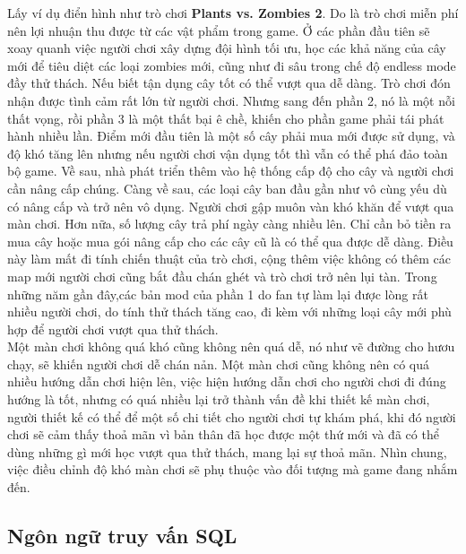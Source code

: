 \begin{itemize}
	Lấy ví dụ điển hình như trò chơi \textbf{Plants vs. Zombies 2}. Do là trò chơi miễn phí nên lợi nhuận thu được từ các vật phẩm trong game. Ở các phần đầu tiên sẽ xoay quanh việc người chơi xây dựng đội hình tối ưu, học các khả năng của cây mới để tiêu diệt các loại zombies mới, cũng như đi sâu trong chế độ endless mode đầy thử thách. Nếu biết tận dụng cây tốt có thể vượt qua dễ dàng. Trò chơi đón nhận được tình cảm rất lớn từ người chơi. Nhưng sang đến phần 2, nó là một nỗi thất vọng, rồi phần 3 là một thất bại ê chề, khiến cho phần game phải tái phát hành nhiều lần. Điểm mới đầu tiên là một số cây phải mua mới được sử dụng, và độ khó tăng lên nhưng nếu người chơi vận dụng tốt thì vẫn có thể phá đảo toàn bộ game. Về sau, nhà phát triển thêm vào hệ thống cấp độ cho cây và người chơi cần nâng cấp chúng. Càng về sau, các loại cây ban đầu gần như vô cùng yếu dù có nâng cấp và trở nên vô dụng. Người chơi gập muôn vàn khó khăn để vượt qua màn chơi. Hơn nữa, số lượng cây trả phí ngày càng nhiều lên. Chỉ cần bỏ tiền ra mua cây hoặc mua gói nâng cấp cho các cây cũ là có thể qua được dễ dàng. Điều này làm mất đi tính chiến thuật của trò chơi, cộng thêm việc không có thêm các map mới người chơi cũng bắt đầu chán ghét và trò chơi trở nên lụi tàn. Trong những năm gần đây,các bản mod của phần 1 do fan tự làm lại được lòng rất nhiều người chơi, do tính thử thách tăng cao, đi kèm với những loại cây mới phù hợp để người chơi vượt qua thử thách.\\
	Một màn chơi không quá khó cũng không nên quá dễ, nó như vẽ đường cho hươu chạy, sẽ khiến người chơi dễ chán nản. Một màn chơi cũng không nên có quá nhiều hướng dẫn chơi hiện lên, việc hiện hướng dẫn chơi cho người chơi đi đúng hướng là tốt, nhưng có quá nhiều lại trở thành vấn đề khi thiết kế màn chơi, người thiết kế có thể để một số chi tiết cho người chơi tự khám phá, khi đó người chơi sẽ cảm thấy thoả mãn vì bản thân đã học được một thứ mới và đã có thể dùng những gì mới học vượt qua thử thách, mang lại sự thoả mãn. Nhìn chung, việc điều chỉnh độ khó màn chơi sẽ phụ thuộc vào đối tượng mà game đang nhắm đến.\\ 
	
\end{itemize}

\subsection{Ngôn ngữ truy vấn SQL}
